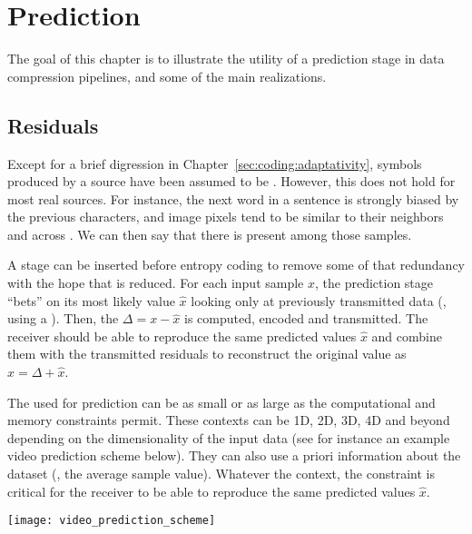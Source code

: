 \chapter{Prediction}\label{sec:prediction}

The goal of this chapter is to illustrate the utility of a prediction stage
in data compression pipelines, and some of the main realizations.

\section{Residuals}

Except for a brief digression in Chapter~\ref{sec:coding:adaptativity}, symbols produced by a source \source have been assumed to be . However, this does not hold for most real sources. For instance, the next word in a sentence is strongly biased by the previous characters, and image pixels tend to be similar to their neighbors and across .
We can then say that there is  present among those samples.

A  stage can be inserted before entropy coding to remove some of that redundancy with the hope that  is reduced. For each input sample $x$, the prediction stage ``bets'' on its most likely value $\hat{x}$ looking only at previously transmitted data (\ie, using a ). Then, the  $\Delta = x - \hat{x}$ is computed, encoded and transmitted.
%
The receiver should be able to reproduce the same predicted values $\hat{x}$ and combine them with the transmitted residuals to reconstruct the original value as $x = \Delta + \hat{x}$.

The  used for prediction can be as small or as large as the computational and memory constraints permit. These contexts can be 1D, 2D, 3D, 4D and beyond depending on the dimensionality of the input data (see for instance an example video prediction scheme below). They can also use a priori information about the dataset (\eg, the average sample value). Whatever the context, the  constraint is critical for the receiver to be able to reproduce the same predicted values $\hat{x}$.

\begin{center}
    \texttt{[image: video\_prediction\_scheme]}
\end{center}

